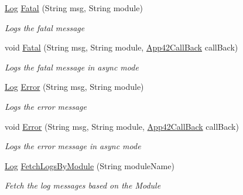 \begin{DoxyCompactItemize}
\hyperlink{classcom_1_1shephertz_1_1app42_1_1paas_1_1sdk_1_1csharp_1_1log_1_1_log}{Log} \hyperlink{classcom_1_1shephertz_1_1app42_1_1paas_1_1sdk_1_1csharp_1_1log_1_1_log_service_a33a0592af9d97c1daaa8ab0ba2923453}{Fatal} (String msg, String module)
\begin{DoxyCompactList}\small\item\em Logs the fatal message \end{DoxyCompactList}\item 
void \hyperlink{classcom_1_1shephertz_1_1app42_1_1paas_1_1sdk_1_1csharp_1_1log_1_1_log_service_a6e5079412b006dd886d64ba59b238933}{Fatal} (String msg, String module, \hyperlink{interfacecom_1_1shephertz_1_1app42_1_1paas_1_1sdk_1_1csharp_1_1_app42_call_back}{App42\+Call\+Back} call\+Back)
\begin{DoxyCompactList}\small\item\em Logs the fatal message in async mode \end{DoxyCompactList}\item 
\hyperlink{classcom_1_1shephertz_1_1app42_1_1paas_1_1sdk_1_1csharp_1_1log_1_1_log}{Log} \hyperlink{classcom_1_1shephertz_1_1app42_1_1paas_1_1sdk_1_1csharp_1_1log_1_1_log_service_a1ff6a1b16465a3177e13eb43e976f05e}{Error} (String msg, String module)
\begin{DoxyCompactList}\small\item\em Logs the error message \end{DoxyCompactList}\item 
void \hyperlink{classcom_1_1shephertz_1_1app42_1_1paas_1_1sdk_1_1csharp_1_1log_1_1_log_service_a939d32dd61baac16d19a483e1401a7ba}{Error} (String msg, String module, \hyperlink{interfacecom_1_1shephertz_1_1app42_1_1paas_1_1sdk_1_1csharp_1_1_app42_call_back}{App42\+Call\+Back} call\+Back)
\begin{DoxyCompactList}\small\item\em Logs the error message in async mode \end{DoxyCompactList}\item 
\hyperlink{classcom_1_1shephertz_1_1app42_1_1paas_1_1sdk_1_1csharp_1_1log_1_1_log}{Log} \hyperlink{classcom_1_1shephertz_1_1app42_1_1paas_1_1sdk_1_1csharp_1_1log_1_1_log_service_a4829b5d604f88786e95c5970fdddbdc2}{Fetch\+Logs\+By\+Module} (String module\+Name)
\begin{DoxyCompactList}\small\item\em Fetch the log messages based on the Module \end{DoxyCompactList}\item 

\end{DoxyCompactItemize}
